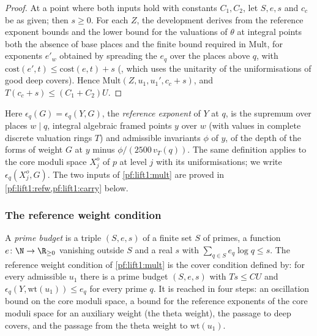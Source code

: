 \begin{proof}
At a point where both inputs hold with constants $C_1,C_2$, let $S,e,s$ and $c_c$ be as given; then
$s\ge0$. For each $Z$, the development derives from the reference exponent bounds and the lower bound
for the valuations of $\theta$ at integral points both the absence of base places and the finite bound
required in $\mathrm{Mult}$, for exponents $e'_w$ obtained by spreading the $e_q$ over the places above
$q$, with $\mathrm{cost}(e',t)\le\mathrm{cost}(e,t)+s$ (, which uses
the unitarity of the uniformisations of good deep covers). Hence $\mathrm{Mult}(Z,u_1,u_1',c_c+s)$, and
$T(c_c+s)\le(C_1+C_2)U$.
\end{proof}

Here $\epsilon_q(G)=\epsilon_q(Y,G)$, the \emph{reference exponent} of $Y$ at $q$, is the supremum over
places $w\mid q$, integral algebraic framed points $y$ over $w$ (with values in complete discrete
valuation rings $T$) and admissible invariants $\phi$ of $y$, of the depth of the forms of weight $G$ at
$y$ minus $\phi/(2500\,v_T(q))$. The same definition applies to the core moduli space $X^o_j$ of $p$ at
level $j$ with its uniformisations; we write $\epsilon_q(X^o_j,G)$. The two inputs of
\cref{pf:lift1:mult} are proved in \cref{pf:lift1:refw,pf:lift1:carry} below.

\subsubsection*{The reference weight condition}
A \emph{prime budget} is a triple $(S,e,s)$ of a finite set $S$ of primes, a function
$e\colon\N\to\R_{\ge0}$ vanishing outside $S$ and a real $s$ with $\sum_{q\in S}e_q\log q\le s$. The
reference weight condition of \cref{pf:lift1:mult} is the cover condition defined by: for every
admissible $u_1$ there is a prime budget $(S,e,s)$ with $Ts\le CU$ and
$\epsilon_q(Y,\mathrm{wt}(u_1))\le e_q$ for every prime $q$. It is reached in four steps: an oscillation
bound on the core moduli space, a bound for the reference exponents of the core moduli space for an
auxiliary weight (the theta weight), the passage to deep covers, and the passage from the theta weight
to $\mathrm{wt}(u_1)$.

